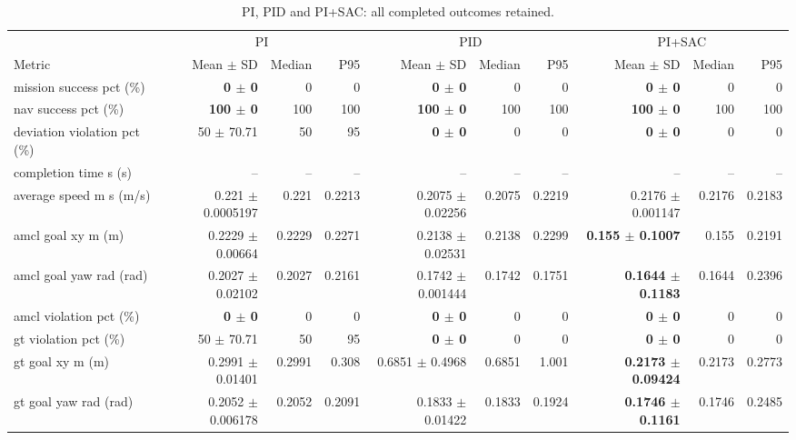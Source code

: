 \begin{table}[t]
\centering
\scriptsize
\caption{PI, PID and PI+SAC: all completed outcomes retained.}
\label{tab:pi-pid-sac}
\begin{tabular}{p{}*{9}{r}}
\toprule
 & \multicolumn{3}{c}{PI} & \multicolumn{3}{c}{PID} & \multicolumn{3}{c}{PI+SAC} \\
\cmidrule(lr){2-4}\cmidrule(lr){5-7}\cmidrule(lr){8-10}
Metric & Mean $\pm$ SD & Median & P95 & Mean $\pm$ SD & Median & P95 & Mean $\pm$ SD & Median & P95 \\
\midrule
mission success pct (\%) & \textbf{0 $\pm$ 0} & 0 & 0 & \textbf{0 $\pm$ 0} & 0 & 0 & \textbf{0 $\pm$ 0} & 0 & 0 \\
nav success pct (\%) & \textbf{100 $\pm$ 0} & 100 & 100 & \textbf{100 $\pm$ 0} & 100 & 100 & \textbf{100 $\pm$ 0} & 100 & 100 \\
deviation violation pct (\%) & 50 $\pm$ 70.71 & 50 & 95 & \textbf{0 $\pm$ 0} & 0 & 0 & \textbf{0 $\pm$ 0} & 0 & 0 \\
completion time s (s) & -- & -- & -- & -- & -- & -- & -- & -- & -- \\
average speed m s (m/s) & 0.221 $\pm$ 0.0005197 & 0.221 & 0.2213 & 0.2075 $\pm$ 0.02256 & 0.2075 & 0.2219 & 0.2176 $\pm$ 0.001147 & 0.2176 & 0.2183 \\
amcl goal xy m (m) & 0.2229 $\pm$ 0.00664 & 0.2229 & 0.2271 & 0.2138 $\pm$ 0.02531 & 0.2138 & 0.2299 & \textbf{0.155 $\pm$ 0.1007} & 0.155 & 0.2191 \\
amcl goal yaw rad (rad) & 0.2027 $\pm$ 0.02102 & 0.2027 & 0.2161 & 0.1742 $\pm$ 0.001444 & 0.1742 & 0.1751 & \textbf{0.1644 $\pm$ 0.1183} & 0.1644 & 0.2396 \\
amcl violation pct (\%) & \textbf{0 $\pm$ 0} & 0 & 0 & \textbf{0 $\pm$ 0} & 0 & 0 & \textbf{0 $\pm$ 0} & 0 & 0 \\
gt violation pct (\%) & 50 $\pm$ 70.71 & 50 & 95 & \textbf{0 $\pm$ 0} & 0 & 0 & \textbf{0 $\pm$ 0} & 0 & 0 \\
gt goal xy m (m) & 0.2991 $\pm$ 0.01401 & 0.2991 & 0.308 & 0.6851 $\pm$ 0.4968 & 0.6851 & 1.001 & \textbf{0.2173 $\pm$ 0.09424} & 0.2173 & 0.2773 \\
gt goal yaw rad (rad) & 0.2052 $\pm$ 0.006178 & 0.2052 & 0.2091 & 0.1833 $\pm$ 0.01422 & 0.1833 & 0.1924 & \textbf{0.1746 $\pm$ 0.1161} & 0.1746 & 0.2485 \\

\end{tabular}
\end{table}
